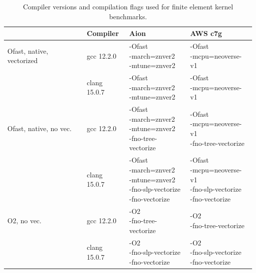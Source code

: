 \begin{table}
    \footnotesize
    \renewcommand{\arraystretch}{1.5}
    \begin{tabular}{l|l|l|l}
                                    & Compiler     & Aion                                                                                            & AWS c7g \\ \hline \hline
        Ofast, native, vectorized   & gcc 12.2.0   & \makecell[l]{-Ofast \\ -march=znver2 \\ -mtune=znver2}                                          & \makecell[l]{-Ofast \\ -mcpu=neoverse-v1} \\ \hline
                                    & clang 15.0.7 & \makecell[l]{-Ofast \\ -march=znver2 \\ -mtune=znver2}                                          & \makecell[l]{-Ofast \\ -mcpu=neoverse-v1} \\ \hline
        Ofast, native, no vec.      & gcc 12.2.0   & \makecell[l]{-Ofast \\ -march=znver2 \\ -mtune=znver2 \\ -fno-tree-vectorize}                   & \makecell[l]{-Ofast \\ -mcpu=neoverse-v1 \\ -fno-tree-vectorize} \\ \hline
                                    & clang 15.0.7 & \makecell[l]{-Ofast \\ -march=znver2 \\ -mtune=znver2 \\ -fno-slp-vectorize \\ -fno-vectorize}  & \makecell[l]{-Ofast \\ -mcpu=neoverse-v1 \\ -fno-slp-vectorize \\ -fno-vectorize} \\ \hline
        O2, no vec.                 & gcc 12.2.0   & \makecell[l]{-O2 \\ -fno-tree-vectorize}                                                        & \makecell[l]{-O2 \\ -fno-tree-vectorize} \\ \hline
                                    & clang 15.0.7 & \makecell[l]{-O2 \\ -fno-slp-vectorize \\ -fno-vectorize}                                       & \makecell[l]{-O2 \\ -fno-slp-vectorize \\ -fno-vectorize} \\ \hline
    \end{tabular}
    \vspace{5pt}
    \caption{Compiler versions and compilation flags used for finite element kernel benchmarks.}
    \label{tab:compilers-kernels}
\end{table}

